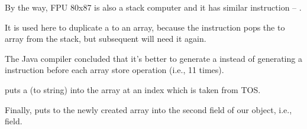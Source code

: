 By the way, FPU 80x87 is also a stack computer and it has similar instruction -- .


It is used here to duplicate a  to an array, because the  instruction pops
the  to array from the stack, but subsequent  will need it again.

The Java compiler concluded that it's better to generate a  instead of generating 
a  instruction before each array store operation (i.e., 11 times).


 puts a  (to string) into the array at an index which is 
taken from \ac{TOS}.


Finally,  puts  to the newly created array into the second field 
of our object, i.e.,  field.

